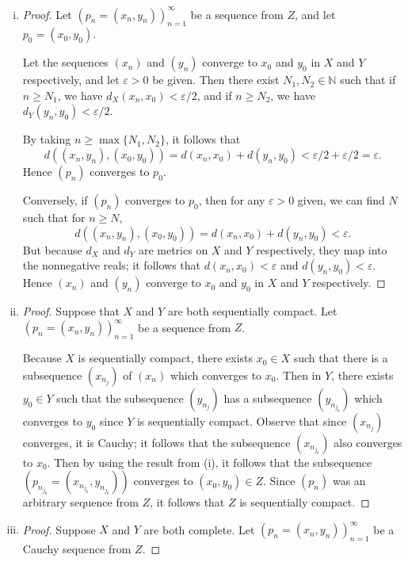 \documentclass[12pt]{amsart}
\begin{document}
\begin{enumerate}[(i)]
    \item \begin{proof}
        Let $(p_n=(x_n,y_n))_{n=1}^\infty$ be a sequence from $Z$, and let $p_0 = (x_0,y_0)$.

        Let the sequences $(x_n)$ and $(y_n)$ converge to $x_0$ and $y_0$ in $X$ and $Y$ respectively, and let $\varepsilon > 0$ be given. Then there exist $N_1,N_2\in \mathbb{N}$ such that if $n\geq N_1$, we have $d_X(x_n,x_0)< \varepsilon/2$, and if $n\geq N_2$, we have $d_Y(y_n,y_0)< \varepsilon/2$.

        By taking $n\geq \max\{N_1,N_2\}$, it follows that \[d((x_n,y_n),(x_0,y_0)) = d(x_n,x_0) + d(y_n,y_0)< \varepsilon/2 + \varepsilon/2 = \varepsilon.\] Hence $(p_n)$ converges to $p_0$.

        Conversely, if $(p_n)$ converges to $p_0$, then for any $\varepsilon>0$ given, we can find $N$ such that for $n\geq N$, \[d((x_n,y_n),(x_0,y_0)) = d(x_n,x_0) + d(y_n,y_0)< \varepsilon.\] But because $d_X$ and $d_Y$ are metrics on $X$ and $Y$ respectively, they map into the nonnegative reals; it follows that $d(x_n,x_0) < \varepsilon$ and $d(y_n,y_0)< \varepsilon$. Hence $(x_n)$ and $(y_n)$ converge to $x_0$ and $y_0$ in $X$ and $Y$ respectively.
    \end{proof}
    \item \begin{proof}
        Suppose that $X$ and $Y$ are both sequentially compact. Let $(p_n=(x_n,y_n))_{n=1}^\infty$ be a sequence from $Z$.

        Because $X$ is sequentially compact, there exists $x_0\in X$ such that there is a subsequence $(x_{n_j})$ of $(x_n)$ which converges to $x_0$. Then in $Y$, there exists $y_0\in Y$ such that the subsequence $(y_{n_j})$ has a subsequence $(y_{n_{j_k}})$ which converges to $y_0$ since $Y$ is sequentially compact. Observe that since $(x_{n_j})$ converges, it is Cauchy; it follows that the subsequence $(x_{n_{j_k}})$ also converges to $x_0$. Then by using the result from (i), it follows that the subsequence $(p_{n_{j_k}} = (x_{n_{j_k}},y_{n_{j_k}}))$ converges to $(x_0,y_0)\in Z$. Since $(p_n)$ was an arbitrary sequence from $Z$, it follows that $Z$ is sequentially compact.
    \end{proof}
    \item \begin{proof}
        Suppose $X$ and $Y$ are both complete. Let $(p_n=(x_n,y_n))_{n=1}^\infty$ be a Cauchy sequence from $Z$.


\end{proof}
\end{enumerate}
\end{document}
